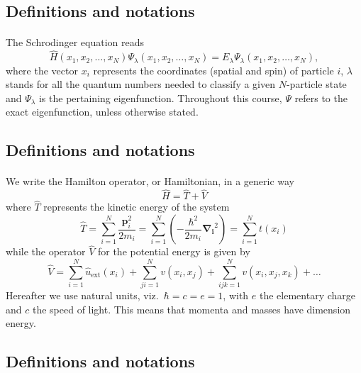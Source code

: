 \documentclass[%
twoside,                 %
final,                   %
10pt]{article}
\begin{document}
\subsection{Definitions and notations}

\paragraph{}
The Schrodinger equation reads 
\begin{equation}
\hat{H}(x_1, x_2, \dots , x_N) \Psi_{\lambda}(x_1, x_2, \dots , x_N) = 
E_\lambda  \Psi_\lambda(x_1, x_2, \dots , x_N), \label{eq:basicSE1}
\end{equation}
where the vector $x_i$ represents the coordinates (spatial and spin) of particle $i$, $\lambda$ stands  for all the quantum
numbers needed to classify a given $N$-particle state and $\Psi_{\lambda}$ is the pertaining eigenfunction.  Throughout this course,
$\Psi$ refers to the exact eigenfunction, unless otherwise stated.



\subsection{Definitions and notations}

\paragraph{}
We write the Hamilton operator, or Hamiltonian,  in a generic way 
\[
	\hat{H} = \hat{T} + \hat{V} 
\]
where $\hat{T}$  represents the kinetic energy of the system
\[
	\hat{T} = \sum_{i=1}^N \frac{\mathbf{p}_i^2}{2m_i} = \sum_{i=1}^N \left( -\frac{\hbar^2}{2m_i} \mathbf{\nabla_i}^2 \right) =
		\sum_{i=1}^N t(x_i)
\]
while the operator $\hat{V}$ for the potential energy is given by
\begin{equation}
	\hat{V} = \sum_{i=1}^N \hat{u}_{\mathrm{ext}}(x_i) + \sum_{ji=1}^N v(x_i,x_j)+\sum_{ijk=1}^Nv(x_i,x_j,x_k)+\dots
\label{eq:firstv}
\end{equation}
Hereafter we use natural units, viz.~$\hbar=c=e=1$, with $e$ the elementary charge and $c$ the speed of light. This means that momenta and masses
have dimension energy.




\subsection{Definitions and notations}
\end{document}
